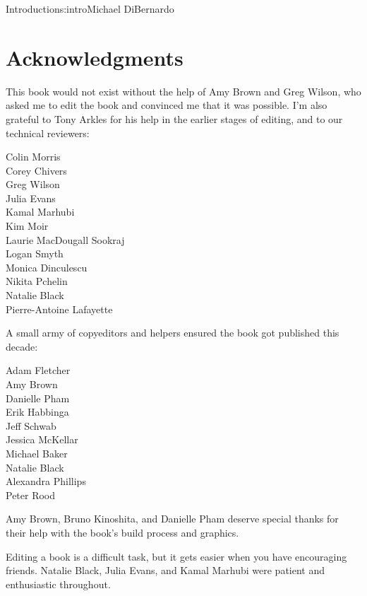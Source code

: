 \begin{aosachapter}{Introduction}{s:intro}{Michael DiBernardo}
\section*{Acknowledgments}

This book would not exist without the help of Amy Brown and Greg Wilson,
who asked me to edit the book and convinced me that it was possible.
I'm also grateful to Tony Arkles for his help in the earlier stages of editing,
and to our technical reviewers:
 
\begin{multicols}{3}
\noindent Colin Morris \\
Corey Chivers \\
Greg Wilson \\
Julia Evans \\
Kamal Marhubi \\
Kim Moir \\
Laurie MacDougall Sookraj \\
Logan Smyth \\
Monica Dinculescu \\
Nikita Pchelin \\
Natalie Black \\
Pierre-Antoine Lafayette \\
\end{multicols}

\newpage  %

\noindent A small army of copyeditors and helpers ensured the book got published this decade:

\begin{multicols}{3}
\noindent Adam Fletcher \\
Amy Brown \\
Danielle Pham \\
Erik Habbinga \\
Jeff Schwab  \\
Jessica McKellar \\
Michael Baker \\
Natalie Black \\
Alexandra Phillips \\
Peter Rood
\end{multicols}

Amy Brown, Bruno Kinoshita, and Danielle Pham deserve special thanks
for their help with the book's build process and graphics.

Editing a book is a difficult task,
but it gets easier when you have encouraging friends.
Natalie Black, Julia Evans, and Kamal Marhubi were patient and enthusiastic throughout.


\end{aosachapter}
